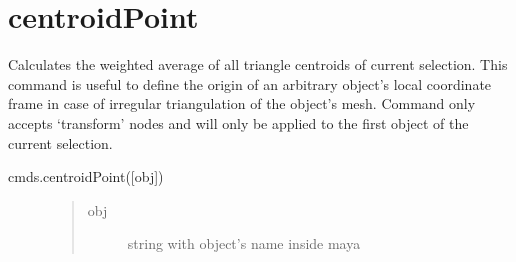 \documentclass[letterpaper,10pt,english]{sphinxmanual}
\begin{document}
\section{centroidPoint}
\label{\detokenize{pk_src.centroidPoint:centroidpoint}}\label{\detokenize{pk_src.centroidPoint::doc}}\label{\detokenize{pk_src.centroidPoint:id1}}
{\hyperref[\detokenize{index:commands}]{}}
\label{\detokenize{pk_src.centroidPoint:module-pk_src.centroidPoint}}
Calculates the weighted average of all triangle centroids of current selection. This command is useful to define the origin of an arbitrary object’s local coordinate frame in case of irregular triangulation of the object’s mesh.
Command only accepts ‘transform’ nodes and will only be applied to the first object of the current selection.

 {\hyperref[\detokenize{pk_src.centerPoint:centerpoint}]{}}

 cmds.centroidPoint({[}obj{]})
\begin{description}
\item[{}] \leavevmode\begin{quote}\begin{description}
\item[{obj}] \leavevmode
string with object’s name inside maya

\end{description}\end{quote}

\item[{}] \leavevmode
\begin{sphinxVerbatim}[commandchars=\\\{\}]
\end{sphinxVerbatim}

\end{description}
\end{document}
